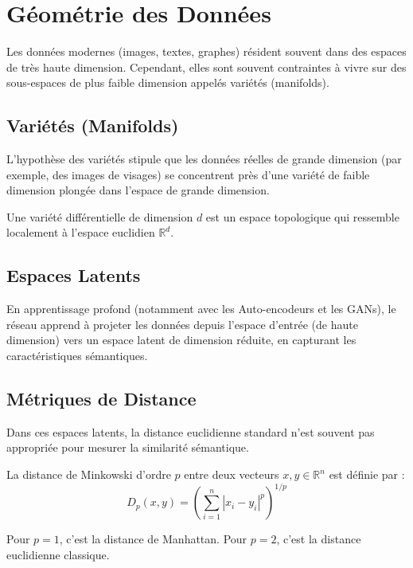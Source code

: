 \chapter{Géométrie des Données}

Les données modernes (images, textes, graphes) résident souvent dans des espaces de très haute dimension. Cependant, elles sont souvent contraintes à vivre sur des sous-espaces de plus faible dimension appelés variétés (manifolds).

\section{Variétés (Manifolds)}

L'hypothèse des variétés stipule que les données réelles de grande dimension (par exemple, des images de visages) se concentrent près d'une variété de faible dimension plongée dans l'espace de grande dimension.

\begin{definition}
Une variété différentielle de dimension $d$ est un espace topologique qui ressemble localement à l'espace euclidien $\mathbb{R}^d$.
\end{definition}

\section{Espaces Latents}

En apprentissage profond (notamment avec les Auto-encodeurs et les GANs), le réseau apprend à projeter les données depuis l'espace d'entrée (de haute dimension) vers un espace latent de dimension réduite, en capturant les caractéristiques sémantiques.

\section{Métriques de Distance}

Dans ces espaces latents, la distance euclidienne standard n'est souvent pas appropriée pour mesurer la similarité sémantique.

\begin{definition}
La distance de Minkowski d'ordre $p$ entre deux vecteurs $x, y \in \mathbb{R}^n$ est définie par :
$$ D_p(x, y) = \left( \sum_{i=1}^n |x_i - y_i|^p \right)^{1/p} $$
\end{definition}

\begin{corollary}
Pour $p=1$, c'est la distance de Manhattan. Pour $p=2$, c'est la distance euclidienne classique.
\end{corollary}
